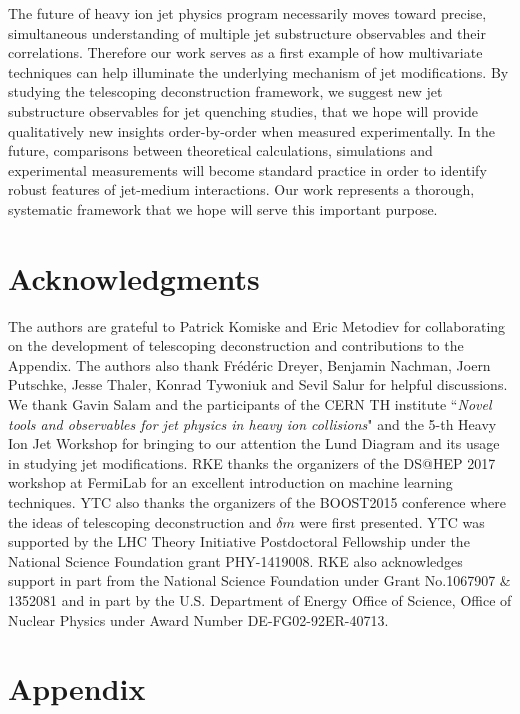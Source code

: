 \documentclass[notoc,preprintnumbers]{JHEP3}
\begin{document}
The future of heavy ion jet physics program necessarily moves toward precise, simultaneous understanding of multiple jet substructure observables and their correlations. Therefore our work serves as a first example of how multivariate techniques can help illuminate the underlying mechanism of jet modifications. By studying the telescoping deconstruction framework, we suggest new jet substructure observables for jet quenching studies, that we hope will provide qualitatively new insights order-by-order when measured experimentally. In the future, comparisons between theoretical calculations, simulations and experimental measurements will become standard practice in order to identify robust features of jet-medium interactions. Our work represents a thorough, systematic framework that we hope will serve this important purpose.

\section*{Acknowledgments}
The authors are grateful to Patrick Komiske and Eric Metodiev for collaborating on the development of telescoping deconstruction and contributions to the Appendix. The authors also thank Fr\'ed\'eric Dreyer, Benjamin Nachman, Joern Putschke, Jesse Thaler, Konrad Tywoniuk and Sevil Salur for helpful discussions. We thank Gavin Salam and the participants of the CERN TH institute ``{\sl Novel tools and observables for jet physics in heavy ion collisions}" and the 5-th Heavy Ion Jet Workshop for bringing to our attention the Lund Diagram and its usage in studying jet modifications. RKE thanks the organizers of the DS@HEP 2017 workshop at FermiLab for an excellent introduction on machine learning techniques. YTC also thanks the organizers of the BOOST2015 conference where the ideas of telescoping deconstruction and $\delta m$ were first presented. YTC was supported by the LHC Theory Initiative Postdoctoral Fellowship under the National Science Foundation grant PHY-1419008. RKE also acknowledges support in part from the National Science Foundation under Grant No.1067907 \& 1352081 and in part by the U.S. Department of Energy Office of Science, Office of Nuclear Physics under Award Number DE-FG02-92ER-40713.









\newpage
\appendix
\section*{Appendix}
\end{document}
